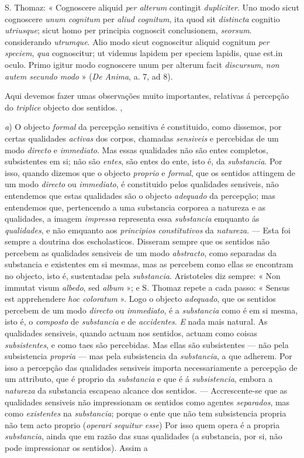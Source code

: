 S. Thomaz: « Cognoscere aliquid \emph{per alterum} contingit \emph{dupliciter}. Uno modo sicut cognoscere \emph{unum cognitum} per \emph{aliud cognitum}, ita quod sit \emph{distincta} cognitio \emph{utriusque}; sicut homo per principia cognoscit conclusionem, \emph{seorsum}. considerando \emph{utrumque}. Alio modo sicut cognoscitur aliquid cognitum \emph{per speciem}, \emph{qua} cognoscitur; ut videmus lapidem per speciem lapidis, quae est.in oculo. Primo igitur modo cognoscere unum per alterum facit \emph{discursum}, \emph{non autem secundo modo} » (\emph{De Anima}, a. 7, ad 8).\par *\par Aqui devemos fazer umas observações muito importantes, relativas á percepção do \emph{triplice} objecto dos sentidos. ,\par \emph{a}) O objecto \emph{formal} da percepção sensitiva é constituido, como dissemos, por certas qualidades \emph{activas} dos corpos, chamadas \emph{sensiveis} e percebidas de um modo \emph{directo} e \emph{immediato}. Mas essas qualidades não são entes completos, subsistentes em si; não são \emph{entes}, são entes do ente, isto é, da \emph{substancia}. Por isso, quando dizemos que o objecto \emph{proprio} e \emph{formal}, que os sentidos attingem de um modo \emph{directo} ou \emph{immediato}, é constituido pelos qualidades sensiveis, não entendemos que estas qualidades são o objecto \emph{adequado} da percepção; mas entendemos que, pertencendo a uma substancia corporea a natureza e as qualidades, a imagem \emph{impressa} representa essa \emph{substancia} emquanto ás \emph{qualidades}, e não emquanto aos \emph{principios constitutivos} da \emph{natureza}. --- Esta foi sempre a doutrina dos escholasticos. Disseram sempre que os sentidos não percebem as qualidades sensiveis de um modo \emph{abstracto}, como separadas da substancia e existentes em si mesmas, mas as percebem como ellas se encontram no objecto, isto é, sustentadas pela \emph{substancia}. Aristoteles diz sempre: « Non immutat visum \emph{albedo}, sed \emph{album} »; e S. Thomaz repete a cada passo: « Sensus est apprehendere \emph{hoc coloratum} ». Logo o objecto \emph{adequado}, que os sentidos percebem de um modo \emph{directo} ou \emph{immediato}, é a \emph{substancia} como é em si mesma, isto é, o \emph{composto} de \emph{substancia} e de \emph{accidentes}. \emph{E} nada mais natural. As qualidades sensiveis, quando actuam nos sentidos, actuam como coisas \emph{subsistentes}, e como taes são percebidas. Mas ellas são subsistentes --- não pela subsistencia \emph{propria} --- mas pela subsistencia da \emph{substancia}, a que adherem. Por isso a percepção das qualidades sensiveis importa necessariamente a percepção de um attributo, que é proprio da \emph{substancia} e que é á \emph{subsistencia}, embora a \emph{natureza} da substancia escapeao alcance dos sentidos. --- Accrescente-se que as qualidades sensiveis não impressionam os sentidos como agentes \emph{separados}, mas como \emph{existentes} na \emph{substancia}; porque o ente que não tem subsistencia propria não tem acto proprio (\emph{operari sequitur esse}) Por isso quem opera é a propria \emph{substancia}, ainda que em razão das suas qualidades (a substancia, por si, não pode impressionar os sentidos). Assim a 